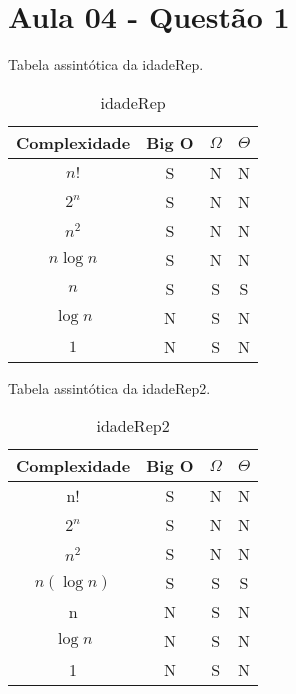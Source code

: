 \section{Aula 04 - Questão 1}

Tabela assintótica da idadeRep. 

\begin{table}[ht!]
    \centering
    \begin{tabular}{|c|c|c|c|}
    \hline
    \textbf{Complexidade} & \textbf{Big O} & $\Omega$ & $\Theta$ \\ \hline
    $n!$ & S & N & N \\ \hline
    $2^n$ & S & N & N \\ \hline
    $n^2$ & S & N & N \\ \hline
    $n\log n$ & S & N & N \\ \hline
    $n$ & S & S & S \\ \hline
    $\log n$ & N & S & N \\ \hline
    $1$ & N & S & N \\ \hline 
    \end{tabular}
    \caption{idadeRep}
\end{table}

Tabela assintótica da idadeRep2. 

\begin{table}[ht!]
    \centering
    \begin{tabular}{|c|c|c|c|}
    \hline
    \textbf{Complexidade} & \textbf{Big O} & $\Omega$ & $\Theta$ \\ \hline
    n! & S & N & N \\ \hline
    $2^n$ & S & N & N \\ \hline
    $n^2$ & S & N & N \\ \hline
    $n(\log n)$ & S & S & S \\ \hline
    n & N & S & N \\ \hline
    $\log n$ & N & S & N \\ \hline
    1 & N & S & N \\ \hline 
    \end{tabular}
    \caption{idadeRep2}
\end{table}